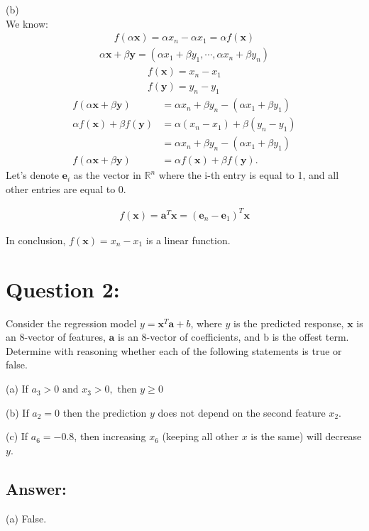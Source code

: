 \documentclass[a4paper,12pt]{article}
\newcommand{\R}{\mathbb{R}}
\begin{document}
(b) \\
We know:
\begin{align*}
    f(\alpha \bm{x}) = \alpha x_n - \alpha x_1 = \alpha f(\bm{x})
\end{align*}
\begin{align*}
    \alpha \bm{x} + \beta \bm{y} = (\alpha x_1 + \beta y_1 , \cdots , \alpha x_n + \beta y_n)
\end{align*}
\begin{align*}
    f(\bm{x}) = x_n - x_1 \\
    f(\bm{y}) = y_n - y_1 
\end{align*}
\begin{align*}
    f(\alpha \bm{x} + \beta \bm{y}) &= \alpha x_n + \beta y_n - (\alpha x_1 + \beta y_1)  \\
    \alpha f(\bm{x}) + \beta f(\bm{y}) &= \alpha(x_n - x_1) + \beta(y_n - y_1)  \\
    &= \alpha x_n + \beta y_n - (\alpha x_1 + \beta y_1) \\
    f(\alpha \bm{x} + \beta \bm{y}) &= \alpha f(\bm{x}) + \beta f(\bm{y}).
\end{align*}
Let's denote \(\bm{e}_i\) as the vector in \(\R^n\) where the i-th entry is equal to 1, and all other entries are equal to 0.

\begin{align*}
    f(\bm{x}) = \bm{a}^T\bm{x} = (\bm{e}_n - \bm{e}_1)^T\bm{x}
\end{align*}

In conclusion, \(f(\bm{x}) = x_n - x_1\) is a linear function.

\section*{Question 2:}
Consider the regression model \(y = \bm{x}^T \bm{a} + b\), where \(y\) is the predicted response,
\(\bm{x}\) is an 8-vector of features, \(\bm{a}\) is an 8-vector of coefficients, and b is the offest term.
Determine with reasoning whether each of the following statements is true or false.

(a) If \(a_3 > 0 \text{ and } x_3 > 0, \text{ then } y \geq 0\)

(b) If \(a_2 = 0\) then the prediction \(y\) does not depend on the second feature \(x_2\).

(c) If \(a_6 = -0.8\), then increasing \(x_6\) (keeping all other \(x\) is the same) will decrease \(y\).

\subsection*{Answer:}
(a) False. 
\end{document}
